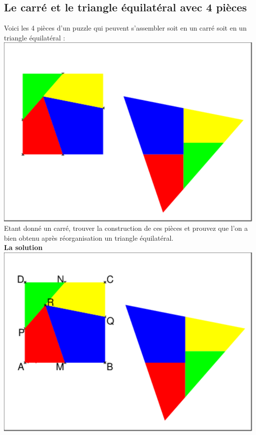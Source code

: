 \documentclass[a4paper,11pt]{book}
\begin{document}
\subsection{Le carr\'e et le triangle \'equilat\'eral avec 4 pi\`eces}
Voici les 4 pi\`eces d'un puzzle qui peuvent s'assembler soit en un carr\'e 
soit en un triangle \'equilat\'eral :\\
\includegraphics[width=\textwidth]{puzzlecan}\\
Etant donn\'e un carr\'e, trouver la construction de ces pi\`eces et prouvez 
que l'on a  bien obtenu apr\`es r\'eorganisation un triangle \'equilat\'eral.\\
{\bf La solution}\\
\includegraphics[width=\textwidth]{puzzlecatri}\\
\end{document}
